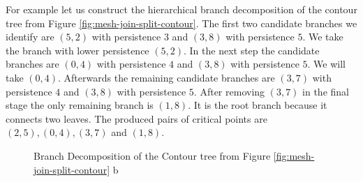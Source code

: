 For example let us construct the hierarchical branch decomposition of the contour tree from Figure \ref{fig:mesh-join-split-contour}. The first two candidate branches we identify are $(5, 2)$ with persistence $3$ and $(3, 8)$ with persistence $5$. We take the branch with lower persistence $(5, 2)$. In the next step the candidate branches are $(0, 4)$ with persistence $4$ and $(3, 8)$ with persistence $5$. We will take $(0, 4)$.
Afterwards the remaining candidate branches are $(3, 7)$ with persistence $4$ and $(3, 8)$ with persistence $5$. After removing $(3, 7)$ in the final stage the only remaining branch is $(1, 8)$. It is the root branch because it connects two leaves.
The produced pairs of critical points are $(2, 5), (0, 4), (3, 7)$ and $(1,8)$.

\begin{figure}%
    \centering
    \caption{Branch Decomposition of the Contour tree from Figure \ref{fig:mesh-join-split-contour} b}%
    \label{fig:branch-decomp}%
\end{figure}

